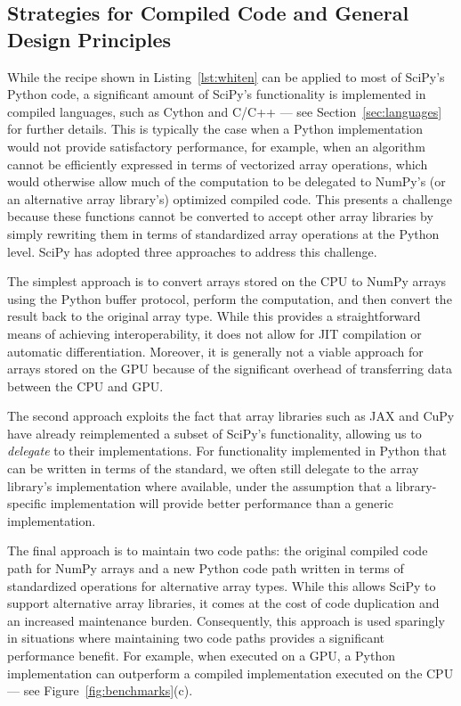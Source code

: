 \documentclass[acmsmall]{acmart}
\begin{document}
\subsection{Strategies for Compiled Code and General Design Principles}

While the recipe shown in Listing~\ref{lst:whiten} can be applied to most of SciPy's
Python code, a significant amount of SciPy's functionality is implemented in compiled
languages, such as Cython and C/C++ --- see Section~\ref{sec:languages} for further
details. This is typically the case when a Python implementation would not provide
satisfactory performance, for example, when an algorithm cannot be efficiently expressed
in terms of vectorized array operations, which would otherwise allow much of the
computation to be delegated to NumPy's (or an alternative array library's) optimized compiled code. This presents
a challenge because these functions cannot be converted to accept other array libraries
by simply rewriting them in terms of standardized array operations at the Python level.
SciPy has adopted three approaches to address this challenge.

The simplest approach is to convert arrays stored on the CPU to NumPy arrays using the
Python buffer protocol, perform the computation, and then convert the result back to the
original array type. While this provides a straightforward means of achieving
interoperability, it does not allow for JIT compilation or automatic differentiation.
Moreover, it is generally not a viable approach for arrays stored on the GPU because of
the significant overhead of transferring data between the CPU and GPU.

The second approach exploits the fact that array libraries such as JAX and CuPy have
already reimplemented a subset of SciPy's functionality, allowing us to \emph{delegate}
to their implementations. For functionality implemented in Python that can be written in
terms of the standard, we often still delegate to the array library's implementation
where available, under the assumption that a library-specific implementation will
provide better performance than a generic implementation.

The final approach is to maintain two code paths: the original compiled code path for
NumPy arrays and a new Python code path written in terms of standardized operations for
alternative array types. While this allows SciPy to support alternative array libraries,
it comes at the cost of code duplication and an increased maintenance burden.
Consequently, this approach is used sparingly in situations where maintaining two code
paths provides a significant performance benefit. For example, when executed on a GPU,
a Python implementation can outperform a compiled implementation executed on the
CPU --- see Figure~\ref{fig:benchmarks}(c).
\end{document}
